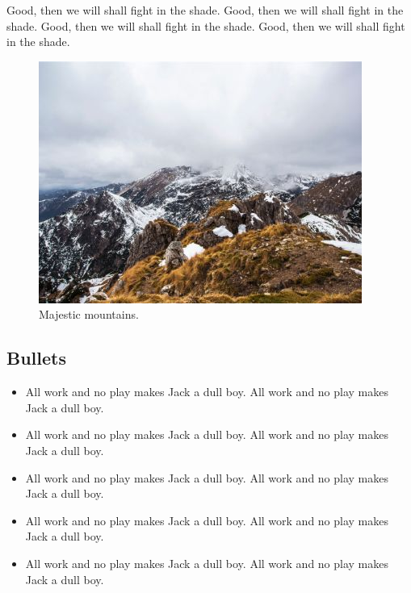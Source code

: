 \documentclass[twocolumn]{article}
\begin{document}
Good, then we will shall fight in the shade.
Good, then we will shall fight in the shade.
Good, then we will shall fight in the shade.
Good, then we will shall fight in the shade.

\begin{figure}[h]
\centering
\includegraphics[width=\linewidth]{figures/mountains.jpg}
\caption{Majestic mountains.}
\label{fig:mountains}
\end{figure}

\subsection{Bullets}

\begin{itemize}

\item All work and no play makes Jack a dull boy.
All work and no play makes Jack a dull boy.

\item All work and no play makes Jack a dull boy.
All work and no play makes Jack a dull boy.

\item All work and no play makes Jack a dull boy.
All work and no play makes Jack a dull boy.

\item All work and no play makes Jack a dull boy.
All work and no play makes Jack a dull boy.

\item All work and no play makes Jack a dull boy.
All work and no play makes Jack a dull boy.

\end{itemize}
\end{document}
